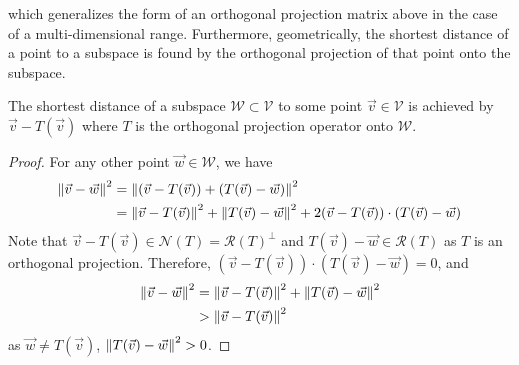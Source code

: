 which generalizes the form of an orthogonal projection matrix above in the case of a multi-dimensional range. Furthermore, geometrically, the shortest distance of a point to a subspace is found by the orthogonal projection of that point onto the subspace.
\begin{proper}
\label{proper:shortestorthoproj}
The shortest distance of a subspace $\mathcal{W} \subset \mathcal{V}$ to some point $\vec{v} \in \mathcal{V}$ is achieved by $\vec{v} - T(\vec{v})$ where $T$ is the orthogonal projection operator onto $\mathcal{W}$.
\end{proper}
\begin{proof}
For any other point $\vec{w} \in \mathcal{W}$, we have
\begin{align*}
\norm{\vec{v} - \vec{w}}^2 &= \norm{(\vec{v} - T(\vec{v})) + (T(\vec{v}) - \vec{w})}^2 \\
&= \norm{\vec{v} - T(\vec{v})}^2 + \norm{T(\vec{v}) - \vec{w}}^2 + 2 (\vec{v} - T(\vec{v})) \cdot (T(\vec{v}) - \vec{w})
\end{align*}
Note that $\vec{v} - T(\vec{v}) \in \mathcal{N}(T) = \mathcal{R}(T)^\perp$ and $T(\vec{v}) - \vec{w} \in \mathcal{R}(T)$ as $T$ is an orthogonal projection. Therefore, $(\vec{v} - T(\vec{v})) \cdot (T(\vec{v}) - \vec{w}) = 0$, and 
\begin{align*}
\norm{\vec{v} - \vec{w}}^2 &= \norm{\vec{v} - T(\vec{v})}^2 + \norm{T(\vec{v}) - \vec{w}}^2 \\
& > \norm{\vec{v} - T(\vec{v})}^2
\end{align*}
as $\vec{w} \neq T(\vec{v})$, $\norm{T(\vec{v}) - \vec{w}}^2 > 0$.
\end{proof}
